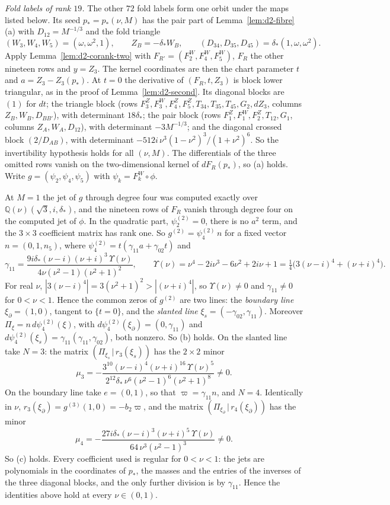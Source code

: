 \emph{Fold labels of rank $19$.}  The other $72$ fold labels form one orbit under the maps
listed below.  Its seed $p_*=p_*(\nu,M)$ has the pair part of Lemma~\ref{lem:d2-fibre}(a) with
$D_{12}=M^{-1/3}$ and the fold triangle
\[
  (W_3,W_4,W_5)=(\omega,\omega^2,1),\qquad Z_B=-\delta_*W_B,\qquad
  (D_{34},D_{35},D_{45})=\delta_*(1,\omega,\omega^2).
\]
Apply Lemma~\ref{lem:d2-corank-two} with $F_{R'}=(F^W_2,F^W_4,F^W_5)$, $F_R$ the other nineteen
rows and $y=Z_3$.  The kernel coordinates are then the chart parameter $t$ and
$a=Z_3-Z_3(p_*)$.  At $t=0$ the derivative of $(F_R,t,Z_3)$ is block lower triangular, as in the
proof of Lemma~\ref{lem:d2-second}.  Its diagonal blocks are $(1)$ for $dt$; the triangle block
(rows $F^Z_3,F^W_3,F^Z_4,F^Z_5,T_{34},T_{35},T_{45},G_2,dZ_3$, columns $Z_B,W_B,D_{BB'}$), with
determinant $18\delta_*$; the pair block (rows $F^Z_1,F^W_1,F^Z_2,T_{12},G_1$, columns
$Z_A,W_A,D_{12}$), with determinant $-3M^{-1/3}$; and the diagonal crossed block $(2/D_{AB})$,
with determinant $-512i\,\nu^3(1-\nu^2)^3/(1+\nu^2)^6$.  So the invertibility hypothesis holds
for all $(\nu,M)$.  The differentials of the three omitted rows vanish on the two-dimensional
kernel of $dF_R(p_*)$, so (a) holds.  Write $g=(\psi_2,\psi_4,\psi_5)$ with
$\psi_k=F^W_k\circ\phi$.

At $M=1$ the jet of $g$ through degree four was computed exactly over
$\mathbb Q(\nu)(\sqrt3,i,\delta_*)$, and the nineteen rows of $F_R$ vanish through degree four on
the computed jet of $\phi$.  In the quadratic part, $\psi_2^{(2)}=0$, there is no $a^2$ term,
and the $3\times3$ coefficient matrix has rank one.  So $g^{(2)}=\psi_4^{(2)}\,n$ for a fixed
vector $n=(0,1,n_5)$, where $\psi_4^{(2)}=t(\gamma_{11}a+\gamma_{02}t)$ and
\[
  \gamma_{11}=\frac{9i\delta_*(\nu-i)(\nu+i)^3\,\Upsilon(\nu)}{4\nu(\nu^2-1)(\nu^2+1)^2},\qquad
  \Upsilon(\nu)=\nu^4-2i\nu^3-6\nu^2+2i\nu+1=\tfrac14\bigl(3(\nu-i)^4+(\nu+i)^4\bigr).
\]
For real $\nu$, $|3(\nu-i)^4|=3(\nu^2+1)^2>|(\nu+i)^4|$, so $\Upsilon(\nu)\ne0$ and
$\gamma_{11}\ne0$ for $0<\nu<1$.  Hence the common zeros of $g^{(2)}$ are two lines: the
\emph{boundary line} $\xi_\partial=(1,0)$, tangent to $\{t=0\}$, and the \emph{slanted line}
$\xi_s=(-\gamma_{02},\gamma_{11})$.  Moreover $\Pi_\xi=n\,d\psi_4^{(2)}(\xi)$, with
$d\psi_4^{(2)}(\xi_\partial)=(0,\gamma_{11})$ and
$d\psi_4^{(2)}(\xi_s)=\gamma_{11}(\gamma_{11},\gamma_{02})$, both nonzero.  So (b) holds.
On the slanted line take $N=3$: the matrix $(\Pi_{\xi_s}\,|\,r_3(\xi_s))$ has the $2\times2$
minor
\[
  \mu_3=-\frac{3^{10}(\nu-i)^4(\nu+i)^{16}\,\Upsilon(\nu)^5}
             {2^{12}\delta_*\,\nu^6(\nu^2-1)^6(\nu^2+1)^8}\ne0 .
\]
On the boundary line take $e=(0,1)$, so that $\varpi=\gamma_{11}n$, and $N=4$.  Identically in
$\nu$, $r_3(\xi_\partial)=g^{(3)}(1,0)=-b_2\varpi$, and the matrix
$(\Pi_{\xi_\partial}\,|\,r_4(\xi_\partial))$ has the minor
\[
  \mu_4=-\frac{27i\delta_*(\nu-i)^3(\nu+i)^5\,\Upsilon(\nu)}{64\,\nu^3(\nu^2-1)^3}\ne0 .
\]
So (c) holds.  Every coefficient used is regular for $0<\nu<1$: the jets are polynomials in the
coordinates of $p_*$, the masses and the entries of the inverses of the three diagonal blocks,
and the only further division is by $\gamma_{11}$.  Hence the identities above hold at every
$\nu\in(0,1)$.

